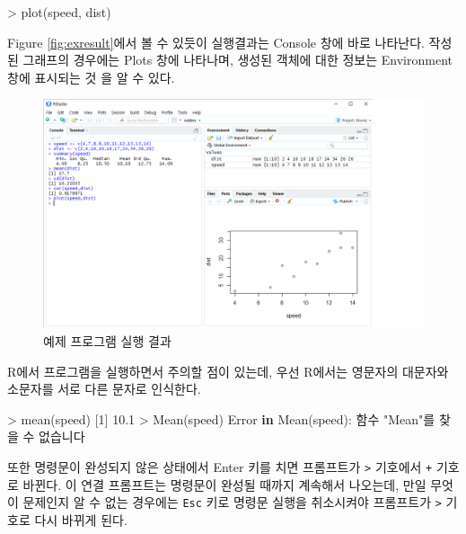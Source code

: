 \documentclass[
]{book}
\newenvironment{Shaded}{\begin{snugshade}}{\end{snugshade}}
\newcommand{\ControlFlowTok}[1]{\textcolor[rgb]{0.13,0.29,0.53}{\textbf{#1}}}
\newcommand{\DecValTok}[1]{\textcolor[rgb]{0.00,0.00,0.81}{#1}}
\newcommand{\FloatTok}[1]{\textcolor[rgb]{0.00,0.00,0.81}{#1}}
\newcommand{\FunctionTok}[1]{\textcolor[rgb]{0.00,0.00,0.00}{#1}}
\newcommand{\NormalTok}[1]{#1}
\newcommand{\SpecialCharTok}[1]{\textcolor[rgb]{0.00,0.00,0.00}{#1}}
\newcommand{\StringTok}[1]{\textcolor[rgb]{0.31,0.60,0.02}{#1}}
\begin{document}
\begin{Shaded}
\begin{Highlighting}[]
\SpecialCharTok{\textgreater{}} \FunctionTok{plot}\NormalTok{(speed, dist)}
\end{Highlighting}
\end{Shaded}

Figure \ref{fig:exresult}에서 볼 수 있듯이 실행결과는 Console 창에 바로
나타난다. 작성된 그래프의 경우에는 Plots 창에 나타나며, 생성된 객체에
대한 정보는 Environment 창에 표시되는 것 을 알 수 있다.

\begin{figure}
\hypertarget{exresult}{%
\centering
\includegraphics[width=5.19792in,height=\textheight]{Figure/ex_result.png}
\caption{예제 프로그램 실행
결과}\label{exresult}
}
\end{figure}

R에서 프로그램을 실행하면서 주의할 점이 있는데, 우선 R에서는 영문자의
대문자와 소문자를 서로 다른 문자로 인식한다.

\begin{Shaded}
\begin{Highlighting}[]
\SpecialCharTok{\textgreater{}} \FunctionTok{mean}\NormalTok{(speed)}
\NormalTok{[}\DecValTok{1}\NormalTok{] }\FloatTok{10.1}
\SpecialCharTok{\textgreater{}} \FunctionTok{Mean}\NormalTok{(speed)}
\NormalTok{Error }\ControlFlowTok{in} \FunctionTok{Mean}\NormalTok{(speed)}\SpecialCharTok{:}\NormalTok{ 함수 }\StringTok{"Mean"}\NormalTok{를 찾을 수 없습니다}
\end{Highlighting}
\end{Shaded}

또한 명령문이 완성되지 않은 상태에서 Enter 키를 치면 프롬프트가 \texttt{\textgreater{}}
기호에서 \texttt{+} 기호로 바뀐다. 이 연결 프롬프트는 명령문이 완성될 때까지
계속해서 나오는데, 만일 무엇이 문제인지 알 수 없는 경우에는 \texttt{Esc} 키로
명령문 실행을 취소시켜야 프롬프트가 \texttt{\textgreater{}} 기호로 다시 바뀌게 된다.
\end{document}
